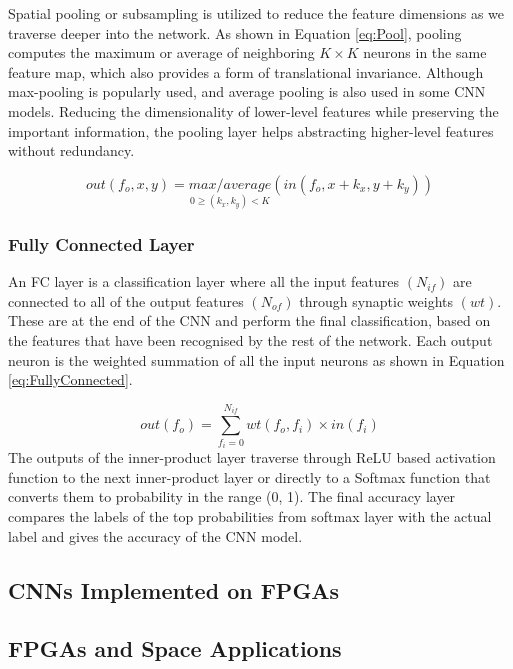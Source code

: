 \documentclass[11pt]{article}
\begin{document}
Spatial pooling or subsampling is utilized to reduce the feature dimensions as we traverse deeper into the network. As shown in Equation \ref{eq:Pool}, pooling computes the maximum or average of neighboring $K\times K$ neurons in the same feature map, which also provides a form of translational invariance\cite{PoolAnalysis}. Although max-pooling is popularly used, and average pooling is also used in some CNN models\cite{PoolAnalysis}. Reducing the dimensionality of lower-level features while preserving the important information, the pooling layer helps abstracting higher-level features without redundancy.

\begin{equation}
out(f_o,x,y)=\underset{0\geqslant (k_x,k_y)<K}{max/average}(in(f_o,x+k_x,y+k_y))
\label{eq:Pool}
\end{equation}

\subsubsection{Fully Connected Layer}
\label{sec:Background-CNN-FC}

An FC layer is a classification layer where all the input features $(N_{if})$ are connected to all of the output features $(N_{of})$ through synaptic weights $(wt)$. These are at the end of the CNN and perform the final classification, based on the features that have been recognised by the rest of the network. Each output neuron is the weighted summation of all the input neurons as shown in Equation \ref{eq:FullyConnected}.

\begin{equation}
out(f_o)=\sum^{N_{if}}_{f_i=0}wt(f_o,f_i)\times in(f_i)
\label{eq:FullyConnected}
\end{equation}
The outputs of the inner-product layer traverse through ReLU based activation function to the next inner-product layer or directly to a Softmax function that converts them to probability in the range (0, 1). The final accuracy layer compares the labels of the top probabilities from softmax layer with the actual label and gives the accuracy of the CNN model.

\subsection{CNNs Implemented on FPGAs}
\label{sec:Background-CNNsImplementedOnFPGAs}

\subsection{FPGAs and Space Applications}
\label{sec:Background-FPGAsAndSpaceApplications}
\end{document}
